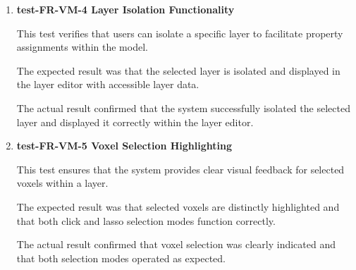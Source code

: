 \documentclass[12pt, titlepage]{article}
\begin{document}
\begin{enumerate}


\item \textbf{test-FR-VM-4 Layer Isolation Functionality}

\hspace{1.5em} This test verifies that users can isolate a specific layer to facilitate property assignments within the model.

The expected result was that the selected layer is isolated and displayed in the layer editor with accessible layer data.

The actual result confirmed that the system successfully isolated the selected layer and displayed it correctly within the layer editor.



\item \textbf{test-FR-VM-5 Voxel Selection Highlighting}

\hspace{1.5em} This test ensures that the system provides clear visual feedback for selected voxels within a layer.

The expected result was that selected voxels are distinctly highlighted and that both click and lasso selection modes function correctly.

The actual result confirmed that voxel selection was clearly indicated and that both selection modes operated as expected.
\end{enumerate}
\end{document}
